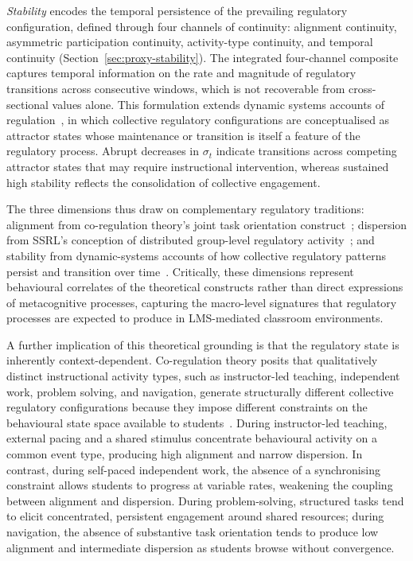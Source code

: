 \documentclass[preprint,12pt,authoryear]{elsarticle}
\begin{document}
\textit{Stability} encodes the temporal persistence of the prevailing regulatory configuration, defined through four channels of continuity: alignment continuity, asymmetric participation continuity, activity-type continuity, and temporal continuity (Section~\ref{sec:proxy-stability}). The integrated four-channel composite captures temporal information on the rate and magnitude of regulatory transitions across consecutive windows, which is not recoverable from cross-sectional values alone. This formulation extends dynamic systems accounts of regulation~\citep{malmberg2017, molenaar2021}, in which collective regulatory configurations are conceptualised as attractor states whose maintenance or transition is itself a feature of the regulatory process. Abrupt decreases in $\sigma_t$ indicate transitions across competing attractor states that may require instructional intervention, whereas sustained high stability reflects the consolidation of collective engagement.

The three dimensions thus draw on complementary regulatory traditions: alignment from co-regulation theory's joint task orientation construct~\citep{hadwin2018, malmberg2017}; dispersion from SSRL's conception of distributed group-level regulatory activity~\citep{hadwin2018, jarvela2021, isohatala2020}; and stability from dynamic-systems accounts of how collective regulatory patterns persist and transition over time~\citep{malmberg2017, molenaar2021}. Critically, these dimensions represent behavioural correlates of the theoretical constructs rather than direct expressions of metacognitive processes, capturing the macro-level signatures that regulatory processes are expected to produce in LMS-mediated classroom environments.

A further implication of this theoretical grounding is that the regulatory state is inherently context-dependent. Co-regulation theory posits that qualitatively distinct instructional activity types, such as instructor-led teaching, independent work, problem solving, and navigation, generate structurally different collective regulatory configurations because they impose different constraints on the behavioural state space available to students~\citep{hadwin2018, malmberg2022}. During instructor-led teaching, external pacing and a shared stimulus concentrate behavioural activity on a common event type, producing high alignment and narrow dispersion. In contrast, during self-paced independent work, the absence of a synchronising constraint allows students to progress at variable rates, weakening the coupling between alignment and dispersion. During problem-solving, structured tasks tend to elicit concentrated, persistent engagement around shared resources; during navigation, the absence of substantive task orientation tends to produce low alignment and intermediate dispersion as students browse without convergence.
\end{document}
